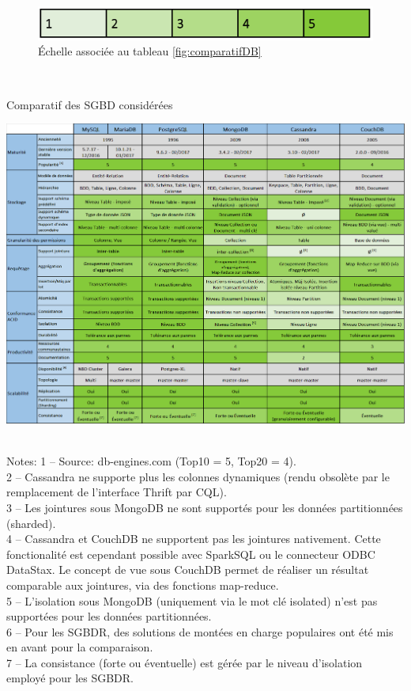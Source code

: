 \begin{spacing}{1.5}
\begin{figure}[h]
\centering
\includegraphics[width=0.5\linewidth]{echelleComparatifDB.png}
\caption{Échelle associée au tableau \ref{fig:comparatifDB}}
\label{fig:echelleComparatifDB}
\end{figure}
\

\begin{table}[H]
\centering
\caption{Comparatif des SGBD considérées}
\label{comparatifDB}
\includegraphics[width=1\linewidth]{comparatifDB.png}
\end{table}
\
\\
Notes:
1 – Source: db-engines.com (Top10 = 5, Top20 = 4).\\
2 – Cassandra ne supporte plus les colonnes dynamiques (rendu obsolète par le remplacement de l’interface Thrift par CQL).\\
3 – Les jointures sous MongoDB ne sont supportés pour les données partitionnées (sharded).\\
4 – Cassandra et CouchDB ne supportent pas les jointures nativement. Cette fonctionalité est cependant possible avec SparkSQL ou le connecteur ODBC DataStax. Le concept de vue sous CouchDB permet de réaliser un résultat comparable aux jointures, via des fonctions map-reduce.\\
5 – L’isolation sous MongoDB (uniquement via le mot clé isolated) n’est pas supportées pour les données partitionnées.\\
6 – Pour les SGBDR, des solutions de montées en charge populaires ont été mis en avant pour la comparaison.\\
7 – La consistance (forte ou éventuelle) est gérée par le niveau d’isolation employé pour les SGBDR.\\


\end{spacing}
